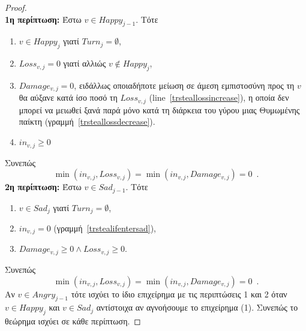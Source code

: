\begin{proof} \ \\
  \textbf{1η περίπτωση:} Έστω $v \in Happy_{j-1}$. Τότε
  \begin{enumerate}
    \item $v \in Happy_j$ γιατί $Turn_{j} = \emptyset$,
    \item $Loss_{v, j} = 0$ γιατί αλλιώς $v \notin Happy_j$,
    \item $Damage_{v, j} = 0$, ειδάλλως οποιαδήποτε μείωση σε άμεση εμπιστοσύνη προς τη $v$ θα αύξανε κατά ίσο ποσό τη
    $Loss_{v, j}$ (line~\ref{trsteallossincrease}), η οποία δεν μπορεί να μειωθεί ξανά παρά μόνο κατά τη διάρκεια του γύρου
    μιας Θυμωμένης παίκτη (γραμμή~\ref{trsteallossdecrease}).
    \item $in_{v, j} \geq 0$
  \end{enumerate}
  Συνεπώς
  \begin{equation*}
    \min\left(in_{v, j}, Loss_{v,j}\right) = \min\left(in_{v, j}, Damage_{v,j}\right) = 0 \enspace.
  \end{equation*}
  \textbf{2η περίπτωση:} Έστω $v \in Sad_{j-1}$. Τότε
  \begin{enumerate}
    \item $v \in Sad_j$ γιατί $Turn_{j} = \emptyset$, 
    \item $in_{v, j} = 0$ (γραμμή~\ref{trstealifentersad}),
    \item $Damage_{v, j} \geq 0 \wedge Loss_{v, j} \geq 0$.
  \end{enumerate}
  Συνεπώς
  \begin{equation*}
    \min\left(in_{v, j}, Loss_{v,j}\right) = \min\left(in_{v, j}, Damage_{v,j}\right) = 0 \enspace.
  \end{equation*}
  Αν $v \in Angry_{j-1}$ τότε ισχύει το ίδιο επιχείρημα με τις περιπτώσεις 1 και 2 όταν $v \in Happy_j$ και $v \in Sad_j$
  αντίστοιχα αν αγνοήσουμε το επιχείρημα (1). Συνεπώς το θεώρημα ισχύει σε κάθε περίπτωση.
\end{proof}
